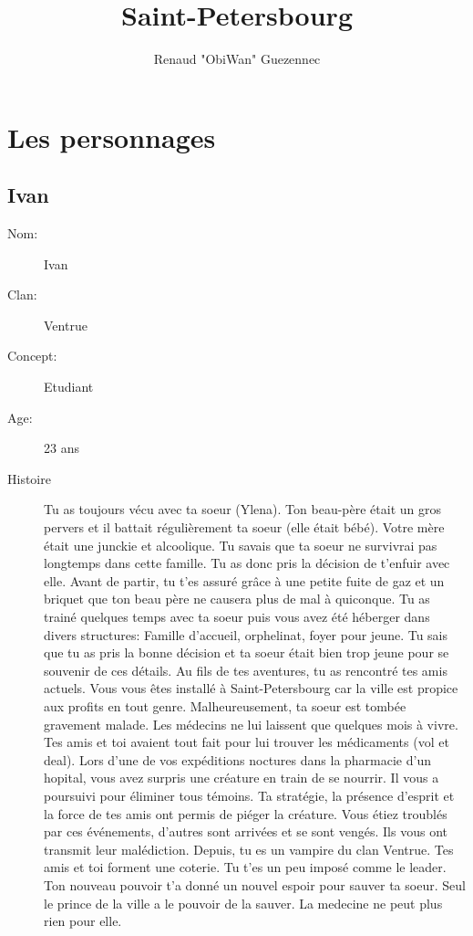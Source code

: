 \documentclass[oneside,12pt]{book}
\title{Saint-Petersbourg}
\author{Renaud "ObiWan" Guezennec}
\date{}
\begin{document}
\maketitle \clearpage
\tableofcontents \clearpage

\chapter{Les personnages}
\begin{flushleft}
\clearpage
\section{Ivan}
\begin{description}
\item[Nom:]{Ivan}
\item[Clan:]{Ventrue}
\item[Concept:]{Etudiant}
\item[Age:]{23 ans}
\item[Histoire]{Tu as toujours vécu avec ta soeur (Ylena). Ton beau-père était un gros pervers et il battait régulièrement ta soeur (elle était bébé). Votre mère était une junckie et alcoolique. Tu savais que ta soeur ne survivrai pas longtemps dans cette famille. Tu as donc pris la décision de t'enfuir avec elle.
Avant de partir, tu t'es assuré grâce à une petite fuite de gaz et un briquet que ton beau père ne causera plus de mal à quiconque.
Tu as trainé quelques temps avec ta soeur puis vous avez été héberger dans divers structures: Famille d'accueil, orphelinat, foyer pour jeune. Tu sais que tu as pris la bonne décision et ta soeur était bien trop jeune pour se souvenir de ces détails.
Au fils de tes aventures, tu as rencontré tes amis actuels. Vous vous êtes installé à Saint-Petersbourg car la ville est propice aux profits en tout genre. Malheureusement, ta soeur est tombée gravement malade.
Les médecins ne lui laissent que quelques mois à vivre. Tes amis et toi avaient tout fait pour lui trouver les médicaments (vol et deal).
Lors d'une de vos expéditions noctures dans la pharmacie d'un hopital, vous avez surpris une créature en train de se nourrir.
Il vous a poursuivi pour éliminer tous témoins. Ta stratégie, la présence d'esprit et la force de tes amis ont permis de piéger la créature.
Vous étiez troublés par ces événements, d'autres sont arrivées et se sont vengés. Ils vous ont transmit leur malédiction.
Depuis, tu es un vampire du clan Ventrue. Tes amis et toi forment une coterie. Tu t'es un peu imposé comme le leader.
Ton nouveau pouvoir t'a donné un nouvel espoir pour sauver ta soeur. Seul le prince de la ville a le pouvoir de la sauver. La medecine ne peut plus rien pour elle.
}
\end{description}
\end{flushleft}
\end{document}
